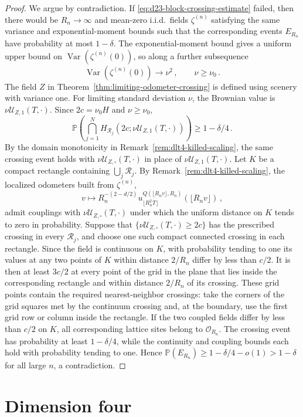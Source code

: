 \documentclass[11pt]{amsart}
\theoremstyle{plain}
\theoremstyle{definition}
\renewcommand{\P}{\mathbb{P}}
\DeclareMathOperator{\Var}{Var}
\begin{document}
\begin{proof}
We argue by contradiction. If \eqref{eq:d23-block-crossing-estimate} failed,
then there would be $R_n\to\infty$ and mean-zero i.i.d.\ fields $\zeta^{(n)}$
satisfying the same variance and exponential-moment bounds such that the
corresponding events $E_{R_n}$ have probability at most $1-\delta$. The
exponential-moment bound gives a uniform upper bound on
$\Var(\zeta^{(n)}(0))$, so along a further subsequence
\[
    \Var(\zeta^{(n)}(0))\to\nu^2\, ,
    \qquad
    \nu\geq\nu_{0}\, .
\]
The field $Z$ in Theorem~\ref{thm:limiting-odometer-crossing} is defined using
scenery with variance one. For limiting standard deviation $\nu$, the Brownian value is
$\nu\mathcal U_{Z,1}(T,\cdot)$. Since $2c=\nu_{0}H$ and
$\nu\geq\nu_{0}$,
\[
    \P\left(
    \bigcap_{j=1}^N
    H_{\mathcal R_j}(2c;\nu\mathcal U_{Z,1}(T,\cdot))
    \right)\geq1-\delta/4\, .
\]
By the domain monotonicity in Remark~\ref{rem:dlt4-killed-scaling}, the same
crossing event holds with $\nu\mathcal U_{Z,\square}(T,\cdot)$ in place of
$\nu\mathcal U_{Z,1}(T,\cdot)$.
Let $K$ be a compact rectangle containing $\bigcup_j\mathcal R_j$. By Remark~\ref{rem:dlt4-killed-scaling}, the localized odometers built from
$\zeta^{(n)}$,
\[
    v\mapsto R_n^{-(2-d/2)} u_{\lfloor R_n^2T\rfloor}^{Q(\lfloor R_nv\rfloor,R_n)}
    (\lfloor R_nv\rfloor)\, ,
\]
admit couplings with $\nu\mathcal U_{Z,\square}(T,\cdot)$ under which the
uniform distance on $K$ tends to zero in probability.
Suppose that
$\{\nu\mathcal U_{Z,\square}(T,\cdot)\geq2c\}$ has the prescribed crossing
in every $\mathcal R_j$, and choose one such compact connected crossing in each
rectangle. Since the field is continuous on $K$, with probability tending to
one its values at any two points of $K$ within distance $2/R_n$ differ by less
than $c/2$. It is then at least $3c/2$ at every point of the grid in the plane
that lies inside the corresponding rectangle and within distance $2/R_n$ of
its crossing. These
grid points contain the required nearest-neighbor crossings: take the corners
of the grid squares met by the continuum crossing and, at the boundary, use
the first grid row or column inside the rectangle. If the two coupled fields
differ by less than $c/2$ on $K$, all corresponding lattice sites belong to
$\mathcal O_{R_n}$. The crossing event has probability at least
$1-\delta/4$, while the continuity and coupling bounds each hold with
probability tending to one. Hence
$\P(E_{R_n})\geq1-\delta/4-o(1)>1-\delta$ for all large $n$, a contradiction.
\end{proof}

\section{Dimension four}\label{sec:dim4-regime}
\end{document}
